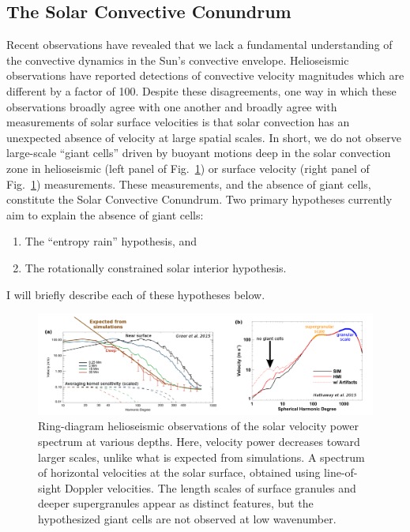 \subsection{The Solar Convective Conundrum}
\label{sct:convective_conundrum}
Recent observations have revealed that we lack a fundamental understanding of the convective dynamics in the Sun's convective envelope.
Helioseismic observations \citep{hanasoge&all2012, greer&all2015} have reported detections of convective velocity magnitudes which are different by a factor of 100.
Despite these disagreements, one way in which these observations broadly agree with one another and broadly agree with measurements of solar surface velocities \citep{hathaway&all2015} is that solar convection has an unexpected absence of velocity at large spatial scales.
In short, we do not observe large-scale ``giant cells'' driven by buoyant motions deep in the solar convection zone in helioseismic (left panel of Fig.~\ref{fig:conv_conundrum}) or surface velocity (right panel of Fig.~\ref{fig:conv_conundrum}) measurements.
These measurements, and the absence of giant cells, constitute the Solar Convective Conundrum.
Two primary hypotheses currently aim to explain the absence of giant cells: 
\begin{enumerate}
\item The ``entropy rain'' hypothesis, and
\item The rotationally constrained solar interior hypothesis.
\end{enumerate}
I will briefly describe each of these hypotheses below.

\begin{figure}[t!]
\includegraphics[width=\textwidth]{./figs/intro/conv_conundrum.pdf}
\caption[The convective conundrum.]
{
	\citep[a, annoted Fig.~3 from][]{greer&all2015} Ring-diagram helioseismic observations of the solar velocity power spectrum at various depths.
	Here, velocity power decreases toward larger scales, unlike what is expected from simulations.
	\citep[b, annotated Fig.~8 from][]{hathaway&all2015} A spectrum of horizontal velocities at the solar surface, obtained using line-of-sight Doppler velocities.
	The length scales of surface granules and deeper supergranules appear as distinct features, but the hypothesized giant cells are not observed at low wavenumber.
	\label{fig:conv_conundrum} 
}
\end{figure}

